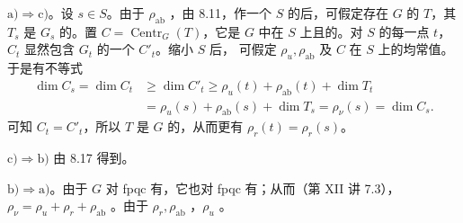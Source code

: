 $\mathrm{a)}\Rightarrow\mathrm{c)}$。设 $s\in S$。由于 $\rho_{\mathrm{ab}}$ ，由 8.11，作一个 $S$ 的后，可假定存在 $G$ 的 $T$，其 $T_s$ 是 $G_s$ 的。置 $C=\operatorname{Centr}_G(T)$，它是 $G$ 中在 $S$ 上且的。对 $S$ 的每一点 $t$，$C_t$ 显然包含 $G_t$ 的一个 $C'_t$。缩小 $S$ 后，
可假定 $\rho_u,\rho_{\mathrm{ab}}$ 及 $C$ 在 $S$ 上的均常值。于是有不等式
\[\begin{aligned}
\dim C_s=\dim C_t&\geq\dim C'_t\geq\rho_u(t)+\rho_{\mathrm{ab}}(t)+\dim T_t\\
&=\rho_u(s)+\rho_{\mathrm{ab}}(s)+\dim T_s=\rho_\nu(s)=\dim C_s.
\end{aligned}\]
可知 $C_t=C'_t$，所以 $T$ 是 $G$ 的，从而更有 $\rho_r(t)=\rho_r(s)$。

$\mathrm{c)}\Rightarrow\mathrm{b)}$ 由 8.17 得到。

$\mathrm{b)}\Rightarrow\mathrm{a)}$。由于 $G$ 对 fpqc 有，它也对 fpqc 有；从而（第 XII 讲 7.3）， $\rho_\nu=\rho_u+\rho_r+\rho_{\mathrm{ab}}$ 。由于 $\rho_r,\rho_{\mathrm{ab}}$ ，$\rho_u$ 。
